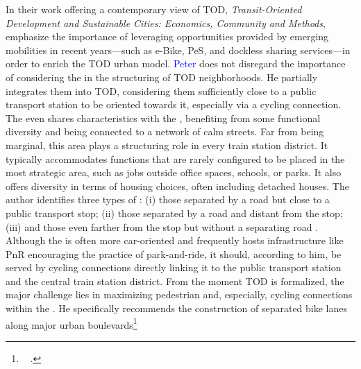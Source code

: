 \begin{refsegment}
In their work offering a contemporary view of \acrshort{TOD}, \foreignlanguage{english}{\textsl{Transit-Oriented Development and Sustainable Cities: Economics, Community and Methods}}, \textcolor{blue}{\textcite[222]{knowles_transit_2019}} emphasize the importance of leveraging opportunities provided by emerging mobilities in recent years—such as \acrshort{e-Bike}, \acrshort{PeS}, and dockless sharing services—in order to enrich the \acrshort{TOD} urban model. \textcolor{blue}{Peter} \textcolor{blue}{\textcite[54-55]{calthorpe_next_1993}} does not disregard the importance of considering the  in the structuring of \acrshort{TOD} neighborhoods. He partially integrates them into \acrshort{TOD}, considering them sufficiently close to a public transport station to be oriented towards it, especially via a cycling connection. The  even shares characteristics with the , benefiting from some functional diversity and being connected to a network of calm streets. Far from being marginal, this area plays a structuring role in every train station district. It typically accommodates functions that are rarely configured to be placed in the most strategic area, such as jobs outside office spaces, schools, or parks. It also offers diversity in terms of housing choices, often including detached houses. The author identifies three types of : (i) those separated by a road but close to a public transport stop; (ii) those separated by a road and distant from the stop; (iii) and those even farther from the stop but without a separating road \textcolor{blue}{\autocite[87]{calthorpe_next_1993}}. Although the  is often more car-oriented and frequently hosts infrastructure like \acrfull{PnR} encouraging the practice of park-and-ride, it should, according to him, be served by cycling connections directly linking it to the public transport station and the central train station district. From the moment \acrshort{TOD} is formalized, the major challenge lies in maximizing pedestrian and, especially, cycling connections within the . He specifically recommends the construction of separated bike lanes along major urban boulevards\footnote{~
     \textcolor{blue}{\autocite[89]{calthorpe_next_1993}}.
}
\end{refsegment}
